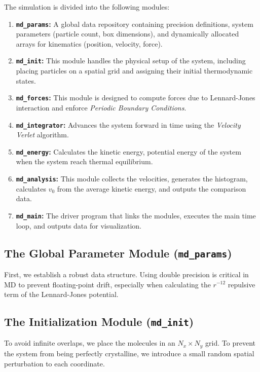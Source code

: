 \documentclass[12pt, a4paper, oneside]{article}
\begin{document}
        The simulation is divided into the following modules:
        \begin{enumerate}
            \item {\bf \texttt{md\_params}:} A global data repository containing precision definitions, system parameters (particle count, box dimensions), and dynamically allocated arrays for kinematics (position, velocity, force).
            \item {\bf \texttt{md\_init}:} This module handles the physical setup of the system, including placing particles on a spatial grid and assigning their initial thermodynamic states.
            \item {\bf \texttt{md\_forces}:} This module is designed to compute forces due to Lennard-Jones interaction and enforce \textit{Periodic Boundary Conditions}.
            \item {\bf \texttt{md\_integrator}:} Advances the system forward in time using the \textit{Velocity Verlet} algorithm.
            \item {\bf \texttt{md\_energy}:} Calculates the kinetic energy, potential energy of the system when the system reach thermal equilibrium.
            \item {\bf \texttt{md\_analysis}:} This module collects the velocities, generates the histogram, calculates $v_0$ from the average kinetic energy, and outputs the comparison data.
            \item {\bf \texttt{md\_main}:} The driver program that links the modules, executes the main time loop, and outputs data for visualization.
        \end{enumerate}
        \subsection{The Global Parameter Module (\texttt{md\_params})}
        First, we establish a robust data structure. Using double precision is critical in MD to prevent floating-point drift, especially when calculating the $r^{-12}$ repulsive term of the Lennard-Jones potential.
        

        \subsection{The Initialization Module (\texttt{md\_init})}
        To avoid infinite overlaps, we place the molecules in an $N_x \times N_y$ grid. To prevent the system from being perfectly crystalline, we introduce a small random spatial perturbation to each coordinate.
        
\end{document}
